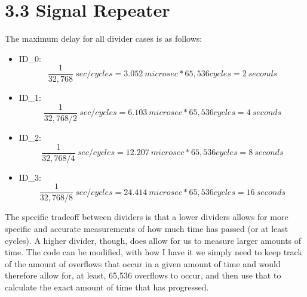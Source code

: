\documentclass{article}
\begin{document}
\section{3.3 Signal Repeater}
The maximum delay for all divider cases is as follows:
\begin{itemize}
	\item ID\_0: $$ \frac{1}{32,768}\ sec/cycles=3.052\ microsec * 65,536 cycles = 2\ seconds$$
	\item ID\_1: $$ \frac{1}{32,768/2}\ sec/cycles=6.103\ microsec * 65,536 cycles = 4\ seconds$$
	\item ID\_2: $$ \frac{1}{32,768/4}\ sec/cycles=12.207\ microsec * 65,536 cycles = 8\ seconds$$
	\item ID\_3: $$ \frac{1}{32,768/8}\ sec/cycles=24.414\ microsec * 65,536 cycles = 16\ seconds$$
\end{itemize}
The specific tradeoff between dividers is that a lower dividers allows for more specific and accurate measurements of how much time has passed (or at least cycles). A higher divider, though, does allow for us to measure larger amounts of time.
\newline
The code can be modified, with how I have it we simply need to keep track of the amount of overflows that occur in a given amount of time and would therefore allow for, at least, 65,536 overflows to occur, and then use that to calculate the exact amount of time that has progressed.
\end{document}
